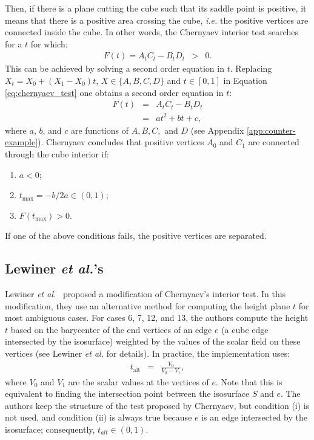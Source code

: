 Then, if there is a plane cutting the cube such that its saddle point is positive, it means that there is a positive area crossing the cube,  \emph{i.e.}  the positive vertices are connected inside the cube.  In other words, the Chernyaev interior test searches for a $t$ for which:
\begin{eqnarray}
F(t) = A_tC_t-B_tD_t &>& 0. \label{eq:chernyaev_test}
\end{eqnarray}
This can be achieved by solving a second order equation in $t$. Replacing $X_t = X_0 + (X_1-X_0)t$,  $X \in \{A, B, C, D\}$ and $t \in [0,1]$ in Equation \eqref{eq:chernyaev_test} one obtains a second order equation in $t$:
\begin{eqnarray}
F(t) &=& A_tC_t-B_tD_t\\
       &=& a t^2 + b t + c  \label{eq:disambiguation},
\end{eqnarray}
where $a$, $b$, and $c$ are functions of $A, B, C,$ and $D$ (see Appendix \ref{app:counter-example}). Chernyaev concludes that positive vertices $A_0$ and $C_1$ are connected through the cube interior if: 
\begin{enumerate}
\item $a < 0$;
\item $t_{\mathrm{max}} = -b / 2a \in (0,1)$; 
\item $F(t_{\mathrm{max}}) > 0$. 
\end{enumerate}
If one of the above conditions fails, the positive vertices are separated.

\subsection{Lewiner \emph{et al.}'s \mc{}}

Lewiner \emph{et al.}~\cite{Lewiner:2003} proposed a modification of Chernyaev's interior test. In this modification, they use an alternative method for computing the height plane $t$ for most ambiguous cases. For cases  6, 7, 12, and 13, the authors compute the height $t$ based on the barycenter of the end vertices of an edge $e$ (a cube edge intersected by the isosurface) weighted by the values of the scalar field on these vertices (see Lewiner \emph{et al.}\cite{Lewiner:2003} for details). In practice, the implementation uses:
\begin{eqnarray}
t_{\mathrm{alt}} &=& \frac{V_{0}}{V_{0} - V_{1}},\label{eq:alternative}
\end{eqnarray}
where $V_{0}$ and $V_{1}$ are the scalar values at the vertices of $e$. Note that this is equivalent to finding the intersection point between the isosurface $S$ and $e$. The authors keep the structure of the test proposed by Chernyaev, but condition (i) is not used, and condition (ii) is always true because $e$ is an edge intersected by the isosurface; consequently, $t_{alt} \in (0,1)$.

